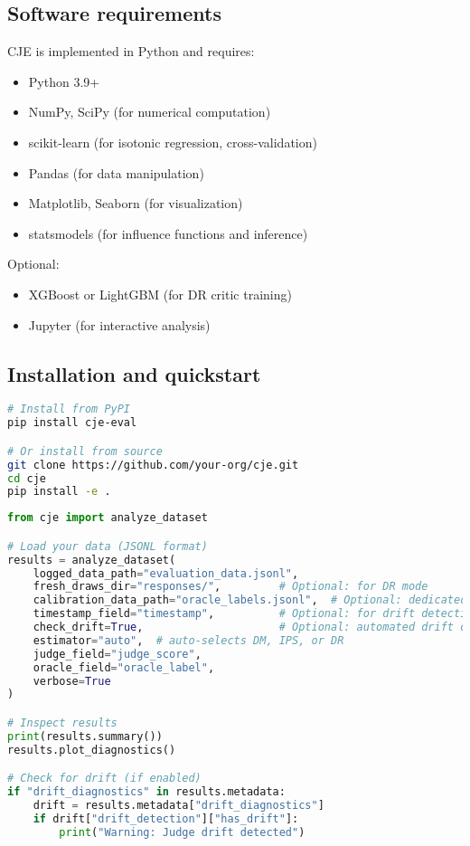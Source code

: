 \subsection{Software requirements}

CJE is implemented in Python and requires:
\begin{itemize}
\item Python 3.9+
\item NumPy, SciPy (for numerical computation)
\item scikit-learn (for isotonic regression, cross-validation)
\item Pandas (for data manipulation)
\item Matplotlib, Seaborn (for visualization)
\item statsmodels (for influence functions and inference)
\end{itemize}

Optional:
\begin{itemize}
\item XGBoost or LightGBM (for DR critic training)
\item Jupyter (for interactive analysis)
\end{itemize}

\subsection{Installation and quickstart}

\begin{lstlisting}[language=bash,caption=Installation]
# Install from PyPI
pip install cje-eval

# Or install from source
git clone https://github.com/your-org/cje.git
cd cje
pip install -e .
\end{lstlisting}

\begin{lstlisting}[language=Python,caption=Quickstart Example]
from cje import analyze_dataset

# Load your data (JSONL format)
results = analyze_dataset(
    logged_data_path="evaluation_data.jsonl",
    fresh_draws_dir="responses/",         # Optional: for DR mode
    calibration_data_path="oracle_labels.jsonl",  # Optional: dedicated calibration set
    timestamp_field="timestamp",          # Optional: for drift detection
    check_drift=True,                     # Optional: automated drift detection
    estimator="auto",  # auto-selects DM, IPS, or DR
    judge_field="judge_score",
    oracle_field="oracle_label",
    verbose=True
)

# Inspect results
print(results.summary())
results.plot_diagnostics()

# Check for drift (if enabled)
if "drift_diagnostics" in results.metadata:
    drift = results.metadata["drift_diagnostics"]
    if drift["drift_detection"]["has_drift"]:
        print("Warning: Judge drift detected")
\end{lstlisting}

